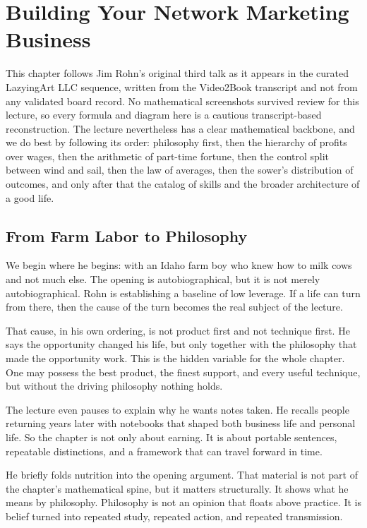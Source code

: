 \chapter{Building Your Network Marketing Business}

This chapter follows Jim Rohn's original third talk as it appears in the curated LazyingArt LLC sequence, written from the Video2Book transcript and not from any validated board record. No mathematical screenshots survived review for this lecture, so every formula and diagram here is a cautious transcript-based reconstruction. The lecture nevertheless has a clear mathematical backbone, and we do best by following its order: philosophy first, then the hierarchy of profits over wages, then the arithmetic of part-time fortune, then the control split between wind and sail, then the law of averages, then the sower's distribution of outcomes, and only after that the catalog of skills and the broader architecture of a good life.

\section{From Farm Labor to Philosophy}

We begin where he begins: with an Idaho farm boy who knew how to milk cows and not much else. The opening is autobiographical, but it is not merely autobiographical. Rohn is establishing a baseline of low leverage. If a life can turn from there, then the cause of the turn becomes the real subject of the lecture.

That cause, in his own ordering, is not product first and not technique first. He says the opportunity changed his life, but only together with the philosophy that made the opportunity work. This is the hidden variable for the whole chapter. One may possess the best product, the finest support, and every useful technique, but without the driving philosophy nothing holds.

The lecture even pauses to explain why he wants notes taken. He recalls people returning years later with notebooks that shaped both business life and personal life. So the chapter is not only about earning. It is about portable sentences, repeatable distinctions, and a framework that can travel forward in time.

He briefly folds nutrition into the opening argument. That material is not part of the chapter's mathematical spine, but it matters structurally. It shows what he means by philosophy. Philosophy is not an opinion that floats above practice. It is belief turned into repeated study, repeated action, and repeated transmission.

